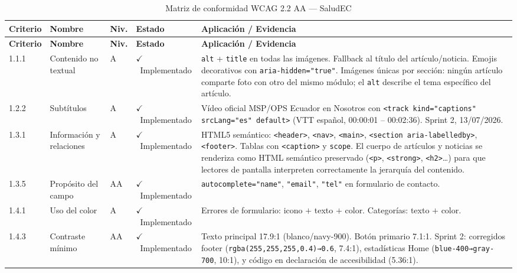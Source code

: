 \documentclass[12pt, a4paper]{article}
\newcommand{\cmark}{\textcolor{successgreen}{$\checkmark$}}
\begin{document}
\begin{longtable}{@{}>{\ttfamily\small}p{1.2cm} p{3.2cm} >{\centering\arraybackslash}p{0.9cm} >{\centering\arraybackslash\small}p{2.5cm} p{5.5cm}@{}}
\caption{Matriz de conformidad WCAG 2.2 AA --- SaludEC} \\
\toprule
\rowcolor{royalblue!12}
\textbf{Criterio} & \textbf{Nombre} & \textbf{Niv.} & \textbf{Estado} & \textbf{Aplicación / Evidencia} \\
\midrule
\endfirsthead
\toprule
\rowcolor{royalblue!12}
\textbf{Criterio} & \textbf{Nombre} & \textbf{Niv.} & \textbf{Estado} & \textbf{Aplicación / Evidencia} \\
\midrule
\endhead
\bottomrule
\endlastfoot

1.1.1 & Contenido no textual & A & \textcolor{successgreen}{\cmark~Implementado} & \texttt{alt} + \texttt{title} en todas las imágenes. Fallback al título del artículo/noticia. Emojis decorativos con \texttt{aria-hidden="true"}. Imágenes únicas por sección: ningún artículo comparte foto con otro del mismo módulo; el \texttt{alt} describe el tema específico del artículo. \\

1.2.2 & Subtítulos & A & \textcolor{successgreen}{\cmark~Implementado} & Vídeo oficial MSP/OPS Ecuador en Nosotros con \texttt{<track kind="captions" srcLang="es" default>} (VTT español, 00:00:01 -- 00:02:36). Sprint 2, 13/07/2026. \\

1.3.1 & Información y relaciones & A & \textcolor{successgreen}{\cmark~Implementado} & HTML5 semántico: \texttt{<header>}, \texttt{<nav>}, \texttt{<main>}, \texttt{<section aria-labelledby>}, \texttt{<footer>}. Tablas con \texttt{<caption>} y \texttt{scope}. El cuerpo de artículos y noticias se renderiza como HTML semántico preservado (\texttt{<p>}, \texttt{<strong>}, \texttt{<h2>}…) para que lectores de pantalla interpreten correctamente la jerarquía del contenido. \\

1.3.5 & Propósito del campo & AA & \textcolor{successgreen}{\cmark~Implementado} & \texttt{autocomplete="name"}, \texttt{"email"}, \texttt{"tel"} en formulario de contacto. \\

1.4.1 & Uso del color & A & \textcolor{successgreen}{\cmark~Implementado} & Errores de formulario: icono $+$ texto $+$ color. Categorías: texto $+$ color. \\

1.4.3 & Contraste mínimo & AA & \textcolor{successgreen}{\cmark~Implementado} & Texto principal 17.9:1 (blanco/navy-900). Botón primario 7.1:1. Sprint 2: corregidos footer (\texttt{rgba(255,255,255,0.4)→0.6}, 7.4:1), estadísticas Home (\texttt{blue-400→gray-700}, 10:1), y código en declaración de accesibilidad (5.36:1). \\


\end{longtable}
\end{document}
